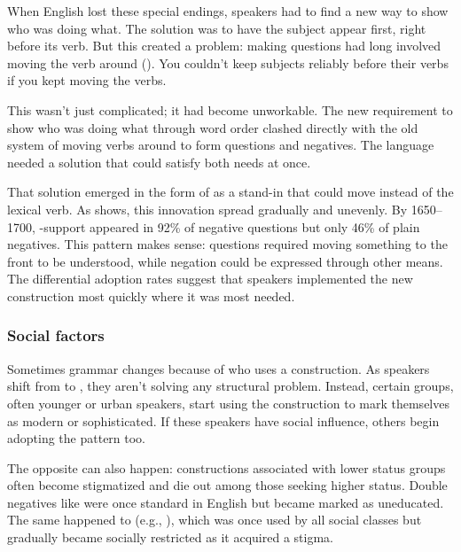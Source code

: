 When English lost these special endings, speakers had to find a new way to show who was doing what. The solution was to have the subject appear first, right before its verb. But this created a problem: making questions had long involved moving the verb around (). You couldn't keep subjects reliably before their verbs if you kept moving the verbs.

This wasn't just complicated; it had become unworkable. The new requirement to show who was doing what through word order clashed directly with the old system of moving verbs around to form questions and negatives. The language needed a solution that could satisfy both needs at once.

That solution emerged in the form of  as a stand-in that could move instead of the lexical verb. As \citet[34]{culicover2008rise} shows, this innovation spread gradually and unevenly. By 1650--1700, -support appeared in 92\% of negative questions but only 46\% of plain negatives. This pattern makes sense: questions required moving something to the front to be understood, while negation could be expressed through other means. The differential adoption rates suggest that speakers implemented the new construction most quickly where it was most needed.

\subsubsection*{Social factors}
Sometimes grammar changes because of who uses a construction. As speakers shift from  to , they aren't solving any structural problem. Instead, certain groups, often younger or urban speakers, start using the construction to mark themselves as modern or sophisticated. If these speakers have social influence, others begin adopting the pattern too.

The opposite can also happen: constructions associated with lower status groups often become stigmatized and die out among those seeking higher status. Double negatives like  were once standard in English but became marked as uneducated. The same happened to  (e.g., ), which was once used by all social classes but gradually became socially restricted as it acquired a stigma.

